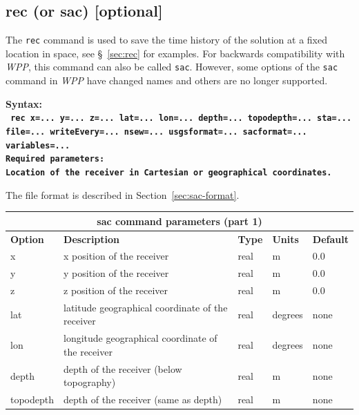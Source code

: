 \documentclass[11pt]{report}
\begin{document}
\subsection{rec (or sac) [optional]}
The \verb+rec+ command is used to save the time history of the solution at a fixed location in
space, see \S~\ref{sec:rec} for examples. For backwards compatibility with \emph{WPP}, this command
can also be called \verb+sac+. However, some options of the \verb+sac+ command in \emph{WPP} have
changed names and others are no longer supported.
\begin{flushleft}
\bf
Syntax:\\
\tt
rec x=... y=... z=... lat=... lon=... depth=... topodepth=... sta=... file=... writeEvery=... nsew=... usgsformat=... sacformat=... variables=...
\\
\bf Required parameters:\\
\rm Location of the receiver in Cartesian or geographical coordinates.
\end{flushleft}
%
The file format is described in Section~\ref{sec:sac-format}.
%
\begin{center}
\begin{tabular}{|l|p{8cm}|l|l|l|} \hline
\multicolumn{5}{|c|}{\bf sac command parameters (part 1)}\\ \hline
\bf{Option} & \bf{Description} & \bf{Type} & \bf{Units} & \bf{Default} \\ \hline \hline
x & x position of the receiver & real & m & 0.0 \\ \hline
y & y position of the receiver & real & m & 0.0 \\ \hline
z & z position of the receiver & real & m & 0.0 \\ \hline
\hline
lat & latitude geographical coordinate of the receiver & real & degrees & none \\ \hline
lon & longitude geographical coordinate of the receiver & real & degrees & none \\ \hline
depth & depth of the receiver (below topography) & real & m & none \\ \hline
topodepth & depth of the receiver (same as depth) & real & m & none \\ \hline
\end{tabular}
\end{center}
\end{document}
